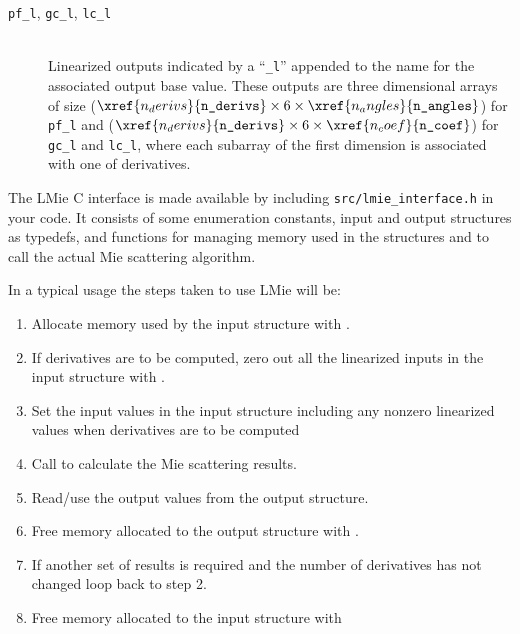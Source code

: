 \begin{description}
\item[\texttt{pf\_l}, \texttt{gc\_l}, \texttt{lc\_l}] \hfill \\
Linearized outputs indicated by a ``\texttt{\_l}'' appended to the name for the associated output base value.  These outputs are three dimensional arrays of size ($\xref{n_derivs}{\texttt{n\_derivs}} \times 6 \times \xref{n_angles}{\texttt{n\_angles}}$) for \texttt{pf\_l} and ($\xref{n_derivs}{\texttt{n\_derivs}} \times 6 \times \xref{n_coef}{\texttt{n\_coef}}$) for \texttt{gc\_l} and \texttt{lc\_l}, where each subarray of the first dimension is associated with one of  derivatives.

\end{description}


%
\label{lmie_c_interface_interface}

The LMie C interface is made available by including \texttt{src/lmie\_interface.h} in your code.  It consists of some enumeration constants, input and output structures as typedefs, and functions for managing memory used in the structures and to call the actual Mie scattering algorithm.

\noindent
In a typical usage the steps taken to use LMie will be:
\begin{enumerate}
\compresslist
\item Allocate memory used by the  input structure with .
\item If derivatives are to be computed, zero out all the linearized inputs in the  input structure with .
\item Set the input values in the  input structure including any nonzero linearized values when derivatives are to be computed
\item Call  to calculate the Mie scattering results.
\item Read/use the output values from the  output structure.
\item Free memory allocated to the  output structure with .
\item If another set of results is required and the number of derivatives has not changed loop back to step 2.
\item Free memory allocated to the  input structure with 
\end{enumerate}

